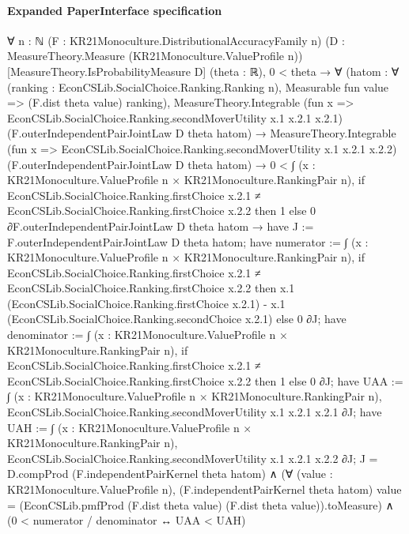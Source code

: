 \documentclass[10pt]{article}
\begin{document}
\paragraph{Expanded PaperInterface specification}
\begin{ReviewVerbatim}
∀ {n : ℕ} (F : KR21Monoculture.DistributionalAccuracyFamily n)
  (D : MeasureTheory.Measure (KR21Monoculture.ValueProfile n)) [MeasureTheory.IsProbabilityMeasure D] (theta : ℝ),
  0 < theta →
    ∀
      (hatom :
        ∀ (ranking : EconCSLib.SocialChoice.Ranking.Ranking n), Measurable fun value => (F.dist theta value) ranking),
      MeasureTheory.Integrable (fun x => EconCSLib.SocialChoice.Ranking.secondMoverUtility x.1 x.2.1 x.2.1)
          (F.outerIndependentPairJointLaw D theta hatom) →
        MeasureTheory.Integrable (fun x => EconCSLib.SocialChoice.Ranking.secondMoverUtility x.1 x.2.1 x.2.2)
            (F.outerIndependentPairJointLaw D theta hatom) →
          0 <
              ∫ (x : KR21Monoculture.ValueProfile n × KR21Monoculture.RankingPair n),
                if
                    EconCSLib.SocialChoice.Ranking.firstChoice x.2.1 ≠
                      EconCSLib.SocialChoice.Ranking.firstChoice x.2.2 then
                  1
                else 0 ∂F.outerIndependentPairJointLaw D theta hatom →
            have J := F.outerIndependentPairJointLaw D theta hatom;
            have numerator :=
              ∫ (x : KR21Monoculture.ValueProfile n × KR21Monoculture.RankingPair n),
                if
                    EconCSLib.SocialChoice.Ranking.firstChoice x.2.1 ≠
                      EconCSLib.SocialChoice.Ranking.firstChoice x.2.2 then
                  x.1 (EconCSLib.SocialChoice.Ranking.firstChoice x.2.1) -
                    x.1 (EconCSLib.SocialChoice.Ranking.secondChoice x.2.1)
                else 0 ∂J;
            have denominator :=
              ∫ (x : KR21Monoculture.ValueProfile n × KR21Monoculture.RankingPair n),
                if
                    EconCSLib.SocialChoice.Ranking.firstChoice x.2.1 ≠
                      EconCSLib.SocialChoice.Ranking.firstChoice x.2.2 then
                  1
                else 0 ∂J;
            have UAA :=
              ∫ (x : KR21Monoculture.ValueProfile n × KR21Monoculture.RankingPair n),
                EconCSLib.SocialChoice.Ranking.secondMoverUtility x.1 x.2.1 x.2.1 ∂J;
            have UAH :=
              ∫ (x : KR21Monoculture.ValueProfile n × KR21Monoculture.RankingPair n),
                EconCSLib.SocialChoice.Ranking.secondMoverUtility x.1 x.2.1 x.2.2 ∂J;
            J = D.compProd (F.independentPairKernel theta hatom) ∧
              (∀ (value : KR21Monoculture.ValueProfile n),
                  (F.independentPairKernel theta hatom) value =
                    (EconCSLib.pmfProd (F.dist theta value) (F.dist theta value)).toMeasure) ∧
                (0 < numerator / denominator ↔ UAA < UAH)
\end{ReviewVerbatim}
\end{document}
